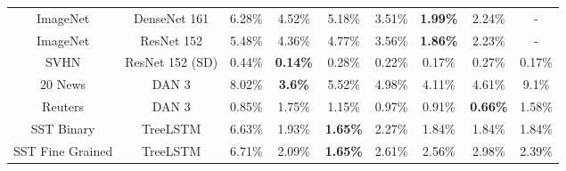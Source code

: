 {\begin{tabular}{c c c c c c c c c}
         ImageNet &     DenseNet 161 &        6.28\% &         4.52\% &    5.18\% &    3.51\% &       {\bf1.99\%} &          2.24\% &              - \\
         ImageNet &       ResNet 152 &        5.48\% &         4.36\% &    4.77\% &    3.56\% &       {\bf1.86\%} &          2.23\% &              - \\
             SVHN &  ResNet 152 (SD) &        0.44\% &       {\bf0.14\%} &    0.28\% &    0.22\% &         0.17\% &          0.27\% &          0.17\% \\
              \midrule
          20 News &            DAN 3 &        8.02\% &        {\bf3.6\%} &    5.52\% &    4.98\% &         4.11\% &          4.61\% &           9.1\% \\
          Reuters &            DAN 3 &        0.85\% &         1.75\% &    1.15\% &    0.97\% &         0.91\% &        {\bf0.66\%} &          1.58\% \\
       SST Binary &         TreeLSTM &        6.63\% &         1.93\% &  {\bf1.65\%} &    2.27\% &         1.84\% &          1.84\% &          1.84\% \\
 SST Fine Grained &         TreeLSTM &        6.71\% &         2.09\% &  {\bf1.65\%} &    2.61\% &         2.56\% &          2.98\% &          2.39\% \\
\bottomrule
\end{tabular}
}
